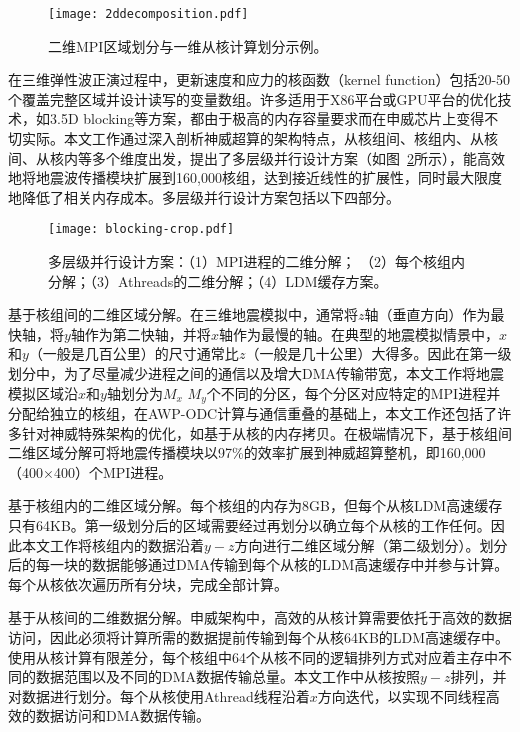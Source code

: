 \begin{figure}[th]
  \centering
  \texttt{[image: 2ddecomposition.pdf]}
  \caption{二维MPI区域划分与一维从核计算划分示例。}
  \label{fig:2ddecomposition}
\end{figure}

在三维弹性波正演过程中，更新速度和应力的核函数（kernel function）包括20-50个覆盖完整区域并设计读写的变量数组。许多适用于X86平台或GPU平台的优化技术，如3.5D blocking等方案\citep {nguyen20103}，都由于极高的内存容量要求而在申威芯片上变得不切实际。本文工作通过深入剖析神威超算的架构特点，从核组间、核组内、从核间、从核内等多个维度出发，提出了多层级并行设计方案（如图~\ref{fig:dd}所示），能高效地将地震波传播模块扩展到160,000核组，达到接近线性的扩展性，同时最大限度地降低了相关内存成本。多层级并行设计方案包括以下四部分。

\begin{figure}[ht]
\centering
\texttt{[image: blocking-crop.pdf]}
\caption{多层级并行设计方案：（1）MPI进程的二维分解； （2）每个核组内分解；（3）Athreads的二维分解；（4）LDM缓存方案。}
\label{fig:dd}
\end{figure}

基于核组间的二维区域分解。在三维地震模拟中，通常将$ z $轴（垂直方向）作为最快轴，将$ y $轴作为第二快轴，并将$ x $轴作为最慢的轴。在典型的地震模拟情景中，$ x $和$ y $（一般是几百公里）的尺寸通常比$ z $（一般是几十公里）大得多。因此在第一级划分中，为了尽量减少进程之间的通信以及增大DMA传输带宽，本文工作将地震模拟区域沿$x$和$y$轴划分为$ M_x $ $ M_y $个不同的分区，每个分区对应特定的MPI进程并分配给独立的核组，在AWP-ODC\citep{cui2010scalable}计算与通信重叠的基础上，本文工作还包括了许多针对神威特殊架构的优化，如基于从核的内存拷贝。在极端情况下，基于核组间二维区域分解可将地震传播模块以97\%的效率扩展到神威超算整机，即160,000（400×400）个MPI进程。

基于核组内的二维区域分解。每个核组的内存为8GB，但每个从核LDM高速缓存只有64KB。第一级划分后的区域需要经过再划分以确立每个从核的工作任何。因此本文工作将核组内的数据沿着$ y-z $方向进行二维区域分解（第二级划分）。划分后的每一块的数据能够通过DMA传输到每个从核的LDM高速缓存中并参与计算。每个从核依次遍历所有分块，完成全部计算。

基于从核间的二维数据分解。申威架构中，高效的从核计算需要依托于高效的数据访问，因此必须将计算所需的数据提前传输到每个从核64KB的LDM高速缓存中。使用从核计算有限差分，每个核组中64个从核不同的逻辑排列方式对应着主存中不同的数据范围以及不同的DMA数据传输总量。本文工作中从核按照$y-z$排列，并对数据进行划分。每个从核使用Athread线程沿着$ x $方向迭代，以实现不同线程高效的数据访问和DMA数据传输。


